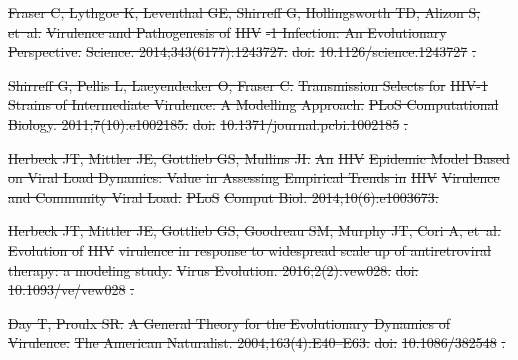 \documentclass[10pt,letterpaper]{article}
\providecommand{\DIFdeltex}[1]{{\protect\color{red}\sout{#1}}}                      %
\providecommand{\DIFdel}[1]{\texorpdfstring{\DIFdeltex{#1}}{}} %
\begin{document}
\DIFdel{Fraser C, Lythgoe K, Leventhal GE, Shirreff G, Hollingsworth TD, Alizon S,
  et~al.
}%
\DIFdel{Virulence and Pathogenesis of }%
\DIFdel{HIV}%
\DIFdel{-1 Infection: An Evolutionary
  Perspective.
}%
\DIFdel{Science. 2014;343(6177):1243727.
}%
\DIFdel{doi:}%
\DIFdel{10.1126/science.1243727}%
\DIFdel{.
}%

\DIFdel{Shirreff G, Pellis L, Laeyendecker O, Fraser C.
}%
\DIFdel{Transmission Selects for }%
\DIFdel{HIV-1}%
\DIFdel{Strains of Intermediate Virulence: A
  Modelling Approach.
}%
\DIFdel{PLoS Computational Biology. 2011;7(10):e1002185.
}%
\DIFdel{doi:}%
\DIFdel{10.1371/journal.pcbi.1002185}%
\DIFdel{.
}%

\DIFdel{Herbeck JT, Mittler JE, Gottlieb GS, Mullins JI.
}%
\DIFdel{An }%
\DIFdel{HIV}%
\DIFdel{Epidemic Model Based on Viral Load Dynamics: Value in
  Assessing Empirical Trends in }%
\DIFdel{HIV}%
\DIFdel{Virulence and Community Viral Load.
}%
\DIFdel{PLoS}%
\DIFdel{Comput Biol. 2014;10(6):e1003673.
}%

\DIFdel{Herbeck JT, Mittler JE, Gottlieb GS, Goodreau SM, Murphy JT, Cori A, et~al.
}%
\DIFdel{Evolution of }%
\DIFdel{HIV}%
\DIFdel{virulence in response to widespread scale up of
  antiretroviral therapy: a modeling study.
}%
\DIFdel{Virus Evolution. 2016;2(2):vew028.
}%
\DIFdel{doi:}%
\DIFdel{10.1093/ve/vew028}%
\DIFdel{.
}%

\DIFdel{Day T, Proulx SR.
}%
\DIFdel{A General Theory for the Evolutionary Dynamics of Virulence.
}%
\DIFdel{The American Naturalist. 2004;163(4):E40--E63.
}%
\DIFdel{doi:}%
\DIFdel{10.1086/382548}%
\DIFdel{.
}%
\end{document}
